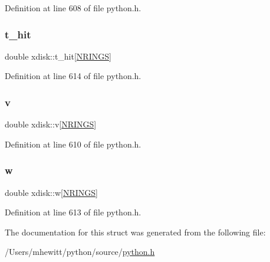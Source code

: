 Definition at line 608 of file python.\+h.

\mbox{\label{structxdisk_a9c645ab31a3dbdd61812c27e510a5437}} 
\subsubsection{\texorpdfstring{t\+\_\+hit}{t\_hit}}
{\footnotesize\ttfamily double xdisk\+::t\+\_\+hit\mbox{[}\hyperlink{python_8h_af8b02d1bed15b59f7062901b55c4d123}{N\+R\+I\+N\+GS}\mbox{]}}



Definition at line 614 of file python.\+h.

\mbox{\label{structxdisk_a3a23c417cee1fe61baf6a6af9dc84b2a}} 
\subsubsection{\texorpdfstring{v}{v}}
{\footnotesize\ttfamily double xdisk\+::v\mbox{[}\hyperlink{python_8h_af8b02d1bed15b59f7062901b55c4d123}{N\+R\+I\+N\+GS}\mbox{]}}



Definition at line 610 of file python.\+h.

\mbox{\label{structxdisk_a0cfeacb568d69b8a9ae73c33c0f7419c}} 
\subsubsection{\texorpdfstring{w}{w}}
{\footnotesize\ttfamily double xdisk\+::w\mbox{[}\hyperlink{python_8h_af8b02d1bed15b59f7062901b55c4d123}{N\+R\+I\+N\+GS}\mbox{]}}



Definition at line 613 of file python.\+h.



The documentation for this struct was generated from the following file\+:\begin{DoxyCompactItemize}
\item 
/\+Users/mhewitt/python/source/\hyperlink{python_8h}{python.\+h}\end{DoxyCompactItemize}
